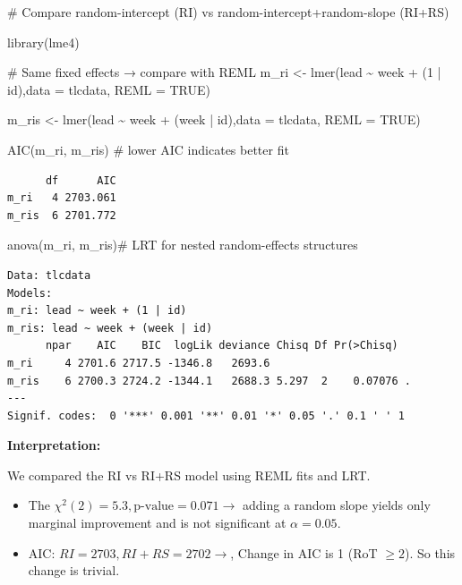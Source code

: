 \documentclass[
  letterpaper,
  DIV=11,
  numbers=noendperiod]{scrreprt}
\newenvironment{Shaded}{\begin{snugshade}}{\end{snugshade}}
\newcommand{\AttributeTok}[1]{\textcolor[rgb]{0.40,0.45,0.13}{#1}}
\newcommand{\CommentTok}[1]{\textcolor[rgb]{0.37,0.37,0.37}{#1}}
\newcommand{\ConstantTok}[1]{\textcolor[rgb]{0.56,0.35,0.01}{#1}}
\newcommand{\DecValTok}[1]{\textcolor[rgb]{0.68,0.00,0.00}{#1}}
\newcommand{\FunctionTok}[1]{\textcolor[rgb]{0.28,0.35,0.67}{#1}}
\newcommand{\NormalTok}[1]{\textcolor[rgb]{0.00,0.23,0.31}{#1}}
\newcommand{\OtherTok}[1]{\textcolor[rgb]{0.00,0.23,0.31}{#1}}
\newcommand{\SpecialCharTok}[1]{\textcolor[rgb]{0.37,0.37,0.37}{#1}}
\providecommand{\tightlist}{%
  \setlength{\itemsep}{0pt}\setlength{\parskip}{0pt}}\usepackage{longtable,booktabs,array}
\begin{document}
\begin{Shaded}
\begin{Highlighting}[]
\CommentTok{\# Compare random{-}intercept (RI) vs random{-}intercept+random{-}slope (RI+RS)}

\FunctionTok{library}\NormalTok{(lme4)}

\CommentTok{\# Same fixed effects → compare with REML}
\NormalTok{m\_ri  }\OtherTok{\textless{}{-}} \FunctionTok{lmer}\NormalTok{(lead }\SpecialCharTok{\textasciitilde{}}\NormalTok{ week }\SpecialCharTok{+}\NormalTok{ (}\DecValTok{1} \SpecialCharTok{|}\NormalTok{ id),}\AttributeTok{data =}\NormalTok{ tlcdata, }\AttributeTok{REML =} \ConstantTok{TRUE}\NormalTok{)}

\NormalTok{m\_ris }\OtherTok{\textless{}{-}} \FunctionTok{lmer}\NormalTok{(lead }\SpecialCharTok{\textasciitilde{}}\NormalTok{ week }\SpecialCharTok{+}\NormalTok{ (week }\SpecialCharTok{|}\NormalTok{ id),}\AttributeTok{data =}\NormalTok{ tlcdata, }\AttributeTok{REML =} \ConstantTok{TRUE}\NormalTok{)}

\FunctionTok{AIC}\NormalTok{(m\_ri, m\_ris) }\CommentTok{\# lower AIC indicates better fit}
\end{Highlighting}
\end{Shaded}

\begin{verbatim}
      df      AIC
m_ri   4 2703.061
m_ris  6 2701.772
\end{verbatim}

\begin{Shaded}
\begin{Highlighting}[]
\FunctionTok{anova}\NormalTok{(m\_ri, m\_ris)}\CommentTok{\# LRT for nested random{-}effects structures}
\end{Highlighting}
\end{Shaded}

\begin{verbatim}
Data: tlcdata
Models:
m_ri: lead ~ week + (1 | id)
m_ris: lead ~ week + (week | id)
      npar    AIC    BIC  logLik deviance Chisq Df Pr(>Chisq)  
m_ri     4 2701.6 2717.5 -1346.8   2693.6                      
m_ris    6 2700.3 2724.2 -1344.1   2688.3 5.297  2    0.07076 .
---
Signif. codes:  0 '***' 0.001 '**' 0.01 '*' 0.05 '.' 0.1 ' ' 1
\end{verbatim}

\textbf{Interpretation:}

We compared the RI vs RI+RS model using REML fits and LRT.

\begin{itemize}
\tightlist
\item
  The \(\chi^2(2) = 5.3, \text{p-value} = 0.071\rightarrow\) adding a
  random slope yields only marginal improvement and is not significant
  at \(\alpha = 0.05\).
\item
  AIC: \(RI = 2703, RI+RS = 2702 \rightarrow\), Change in AIC is 1 (RoT
  \(\geq 2\)). So this change is trivial.
\end{itemize}
\end{document}
